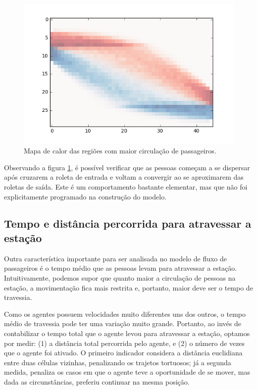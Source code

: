 \documentclass[preprint,12pt]{elsarticle}
\begin{document}
\begin{figure}[H]
	\centering
	\includegraphics[totalheight=7cm]{figures/heatmap.png}
	\caption{Mapa de calor das regiões com maior circulação de passageiros.}
	\label{fig:heatmap}
\end{figure}

Observando a figura \ref{fig:heatmap}, é possível verificar que as pessoas começam a se dispersar após cruzarem a roleta de entrada e voltam a convergir ao se aproximarem das roletas de saída. Este é um comportamento bastante elementar, mas que não foi explicitamente programado na construção do modelo.

\subsection{Tempo e distância percorrida para atravessar a estação}
\label{subsec:tempo_travessia}

Outra característica importante para ser analisada no modelo de fluxo de passageiros é o tempo médio que as pessoas levam para atravessar a estação. Intuitivamente, podemos supor que quanto maior a circulação de pessoas na estação, a movimentação fica mais restrita e, portanto, maior deve ser o tempo de travessia.

Como os agentes possuem velocidades muito diferentes uns dos outros, o tempo médio de travessia pode ter uma variação muito grande. Portanto, ao invés de contabilizar o tempo total que o agente levou para atravessar a estação, optamos por medir: (1) a distância total percorrida pelo agente, e (2) o número de vezes que o agente foi ativado. O primeiro indicador considera a distância euclidiana entre duas células vizinhas, penalizando os trajetos tortuosos; já a segunda medida, penaliza os casos em que o agente teve a oportunidade de se mover, mas dada as circunstâncias, preferiu continuar na mesma posição.
\end{document}
